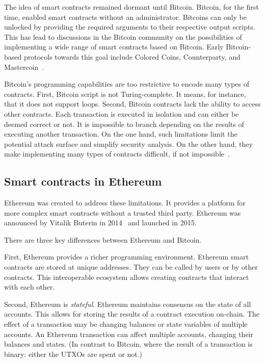 The idea of smart contracts remained dormant until Bitcoin.
Bitcoin, for the first time, enabled smart contracts without an administrator.
Bitcoins can only be unlocked by providing the required arguments to their respective output scripts.
This has lead to discussions in the Bitcoin community on the possibilities of implementing a wide range of smart contracts based on Bitcoin.
Early Bitcoin-based protocols towards this goal include Colored Coins, Counterparty, and Mastercoin~\cite{Rosenfeld2012, Willett2016, Bartoletti2017a}.

Bitcoin's programming capabilities are too restrictive to encode many types of contracts.
First, Bitcoin script is not Turing-complete.
It means, for instance, that it does not support loops.
Second, Bitcoin contracts lack the ability to access other contracts.
Each transaction is executed in isolation and can either be deemed correct or not.
It is impossible to branch depending on the results of executing another transaction.
On the one hand, such limitations limit the potential attack surface and simplify security analysis.
On the other hand, they make implementing many types of contracts difficult, if not impossible~\cite{Miller2019}.


\subsection{Smart contracts in Ethereum}

Ethereum was created to address these limitations.
It provides a platform for more complex smart contracts without a trusted third party.
Ethereum was announced by Vitalik Buterin in 2014~\cite{Buterin2014, Wood2014} and launched in 2015.

There are three key differences between Ethereum and Bitcoin.

First, Ethereum provides a richer programming environment.
Ethereum smart contracts are stored at unique addresses.
They can be called by users or by other contracts.
This interoperable ecosystem allows creating contracts that interact with each other.

Second, Ethereum is \textit{stateful}.
Ethereum maintains consensus on the state of all accounts.
This allows for storing the results of a contract execution on-chain.
The effect of a transaction may be changing balances or state variables of multiple accounts.
An Ethereum transaction can affect multiple accounts, changing their balances and states.
(In contrast to Bitcoin, where the result of a transaction is binary: either the UTXOs are spent or not.)

